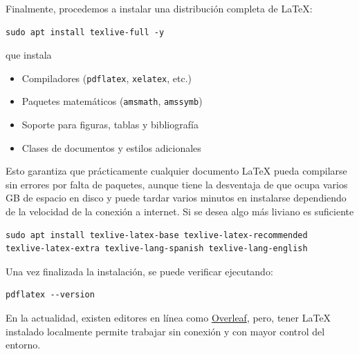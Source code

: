 \documentclass[12pt]{article}
\begin{document}
Finalmente, procedemos a instalar una distribución completa de \LaTeX:
\begin{lstlisting}
sudo apt install texlive-full -y
\end{lstlisting}
que instala
\begin{itemize}
    \item Compiladores (\texttt{pdflatex}, \texttt{xelatex}, etc.)
    \item Paquetes matemáticos (\texttt{amsmath}, \texttt{amssymb})
    \item Soporte para figuras, tablas y bibliografía
    \item Clases de documentos y estilos adicionales
\end{itemize}
Esto garantiza que prácticamente cualquier documento \LaTeX{} pueda compilarse 
sin errores por falta de paquetes, aunque tiene la desventaja de que ocupa varios GB de espacio en disco y 
puede tardar varios minutos en instalarse dependiendo de la velocidad de la conexión a internet.
Si se desea algo más liviano es suficiente 
\begin{lstlisting}
sudo apt install texlive-latex-base texlive-latex-recommended 
texlive-latex-extra texlive-lang-spanish texlive-lang-english
\end{lstlisting}
Una vez finalizada la instalación, se puede verificar ejecutando:
\begin{lstlisting}
pdflatex --version
\end{lstlisting}
En la actualidad, existen editores en línea como \href{https://www.overleaf.com/project}{Overleaf}, pero, tener \LaTeX{} instalado localmente 
permite trabajar sin conexión y con mayor control del entorno.


\end{document}
